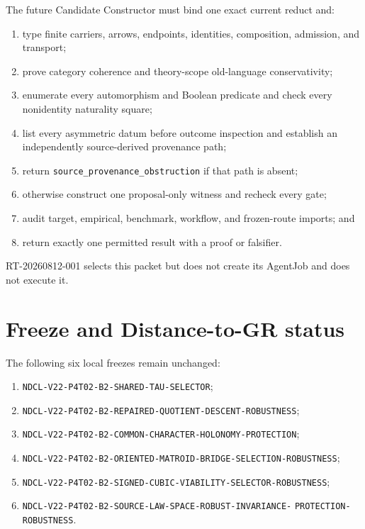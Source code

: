 \documentclass[11pt]{article}
\begin{document}
The future Candidate Constructor must bind one exact current reduct and:
\begin{enumerate}[leftmargin=2em]
  \item type finite carriers, arrows, endpoints, identities, composition,
        admission, and transport;
  \item prove category coherence and theory-scope old-language conservativity;
  \item enumerate every automorphism and Boolean predicate and check every
        nonidentity naturality square;
  \item list every asymmetric datum before outcome inspection and establish an
        independently source-derived provenance path;
  \item return \texttt{source\_provenance\_obstruction} if that path is absent;
  \item otherwise construct one proposal-only witness and recheck every gate;
  \item audit target, empirical, benchmark, workflow, and frozen-route imports;
        and
  \item return exactly one permitted result with a proof or falsifier.
\end{enumerate}

RT-20260812-001 selects this packet but does not create its AgentJob and does
not execute it.

\section{Freeze and Distance-to-GR status}

The following six local freezes remain unchanged:
\begin{enumerate}[leftmargin=2em]
  \item \texttt{NDCL-V22-P4T02-B2-SHARED-TAU-SELECTOR};
  \item \texttt{NDCL-V22-P4T02-B2-REPAIRED-QUOTIENT-DESCENT-ROBUSTNESS};
  \item \texttt{NDCL-V22-P4T02-B2-COMMON-CHARACTER-HOLONOMY-PROTECTION};
  \item \texttt{NDCL-V22-P4T02-B2-ORIENTED-MATROID-BRIDGE-SELECTION-ROBUSTNESS};
  \item \texttt{NDCL-V22-P4T02-B2-SIGNED-CUBIC-VIABILITY-SELECTOR-ROBUSTNESS};
  \item \texttt{NDCL-V22-P4T02-B2-SOURCE-LAW-SPACE-ROBUST-INVARIANCE-}
        \texttt{PROTECTION-ROBUSTNESS}.
\end{enumerate}
\end{document}

